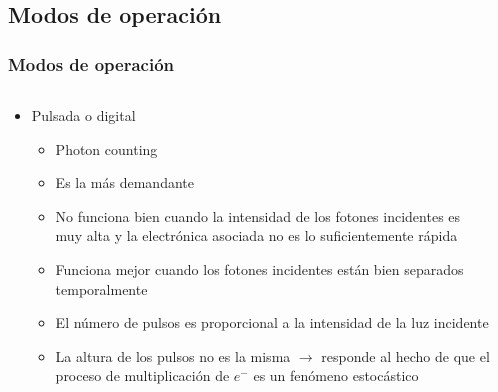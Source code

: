 \documentclass{beamer}
\begin{document}
\subsection{Modos de operaci\'on}

\begin{frame}
\frametitle{Modos de operaci\'on}
\begin{columns}
\begin{column}{0.60\textwidth}
\begin{block}{}
\begin{itemize}
\item Pulsada o digital
\begin{itemize}
\item Photon counting
\item Es la m\'as demandante
\item No funciona bien cuando la intensidad de los fotones incidentes es muy alta y la
electr\'onica asociada no es lo suficientemente r\'apida
\item Funciona mejor cuando los fotones incidentes est\'an bien separados temporalmente
\item El n\'umero de pulsos es proporcional a la intensidad de la luz incidente  
\item {\color{blue}La altura de los pulsos no es la misma $\rightarrow$ responde al hecho de
que el proceso de multiplicaci\'on de $e^-$ es un fen\'omeno estoc\'astico}
\end{itemize}

\end{itemize}
\end{block}
\end{column} 
\begin{column}{0.40\textwidth}
\begin{center}
\end{center}
\end{column}
\end{columns}
\end{frame} 
\end{document}

